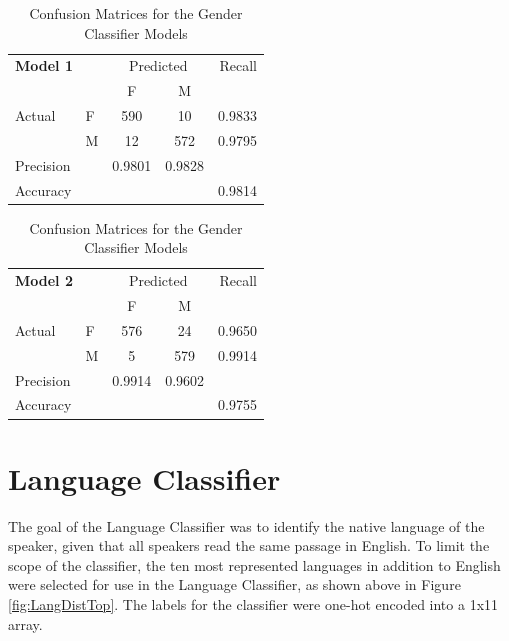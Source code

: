 \begin{table}[h]
\begin{center}
\caption{Confusion Matrices for the Gender Classifier Models}
\begin{tabular}{l l | c c r }
\multicolumn{2}{l}{\textbf{Model 1}} & \multicolumn{2}{c}{Predicted} & Recall \\
& & F & M &  \\ 
\cline{2-5}
Actual & F & 590 &  10 & 0.9833 \\
& M & 12 & 572 & 0.9795 \\  \hline
Precision&  & 0.9801 & 0.9828 \\ 
Accuracy & & &  & 0.9814 \\
\end{tabular}
\begin{tabular}{l l | c c r }
\multicolumn{2}{l}{\textbf{Model 2}} & \multicolumn{2}{c}{Predicted} & Recall \\
& & F& M &  \\ 
\cline{2-5}
Actual & F & 576 &  24 & 0.9650 \\
& M & 5 & 579 & 0.9914 \\  \hline
Precision&  & 0.9914 & 0.9602 \\ 
Accuracy & & &  & 0.9755 \\
\end{tabular}
\label{tab:GenConfusion}
\end{center}
\end{table} 


\section{Language Classifier}

The goal of the Language Classifier was to identify the native language of the speaker, given that all speakers read the same passage in English. To limit the scope of the classifier, the ten most represented languages in addition to English were selected for use in the Language Classifier, as shown above in Figure \ref{fig:LangDistTop}. The labels for the classifier were one-hot encoded into a 1x11 array.

